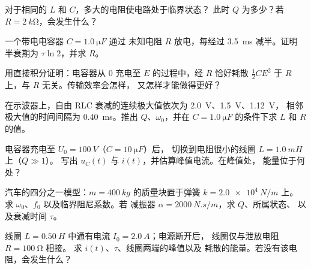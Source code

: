 \begin{exercise}[$\star$]\label{exo:b1:transient-regimes:4}
对于相同的 $L$ 和 $C$，多大的电阻使电路处于临界状态？
此时 $Q$ 为多少？若 $R = \qty{2}{k\ohm}$，会发生什么？
\end{exercise}

\begin{exercise}[$\star\star$]\label{exo:b1:transient-regimes:5}
一个带电电容器 $C = \qty{1.0}{\micro F}$ 通过
未知电阻 $R$ 放电，每经过 \qty{3.5}{ms} 减半。证明
半衰期为 $\tau\ln 2$，并求 $R$。
\end{exercise}

\begin{exercise}[$\star\star$]\label{exo:b1:transient-regimes:6}
用直接积分证明：电容器从 $0$ 充电至 $E$
的过程中，经 $R$ 恰好耗散 $\tfrac12 CE^2$ 于 $R$ 上，与
$R$ 无关。传输效率会怎样，
又怎样才能做得更好？
\end{exercise}

\begin{exercise}[$\star\star$]\label{exo:b1:transient-regimes:7}
在示波器上，自由 RLC 衰减的连续极大值依次为
\qty{2.0}{V}、\qty{1.5}{V}、\qty{1.12}{V}，
相邻极大值的时间间隔为 \qty{0.40}{ms}。推出 $Q$、$\omega_0$，并在 $C = \qty{1.0}{\micro F}$ 的条件下求
$L$ 和 $R$ 的值。
\end{exercise}

\begin{exercise}[$\star\star$]\label{exo:b1:transient-regimes:8}
电容器充电至 $U_0 = \qty{100}{V}$（$C = \qty{10}{\micro F}$）后，
切换到电阻很小的线圈 $L = \qty{1.0}{mH}$ 上（$Q \gg 1$）。
写出 $u_C(t)$ 与 $i(t)$，并估算峰值电流。在峰值处，
能量位于何处？
\end{exercise}

\begin{exercise}[$\star\star$]\label{exo:b1:transient-regimes:9}
汽车的四分之一模型：$m = \qty{400}{kg}$ 的质量块置于弹簧 $k = \qty{2.0e4}{N/m}$ 上。
求 $\omega_0$、$f_0$ 以及临界阻尼系数。若
减振器 $\alpha = \qty{2000}{N.s/m}$，求 $Q$、所属状态、
以及衰减时间 $\tau$。
\end{exercise}

\begin{exercise}[$\star\star\star$]\label{exo:b1:transient-regimes:10}
线圈 $L = \qty{0.50}{H}$ 中通有电流 $I_0 = \qty{2.0}{A}$；电源断开后，
线圈仅与泄放电阻 $R = \qty{100}{\ohm}$ 相接。
求 $i(t)$、$\tau$、线圈两端的峰值以及
耗散的能量。若没有该电阻，会发生什么？
\end{exercise}

